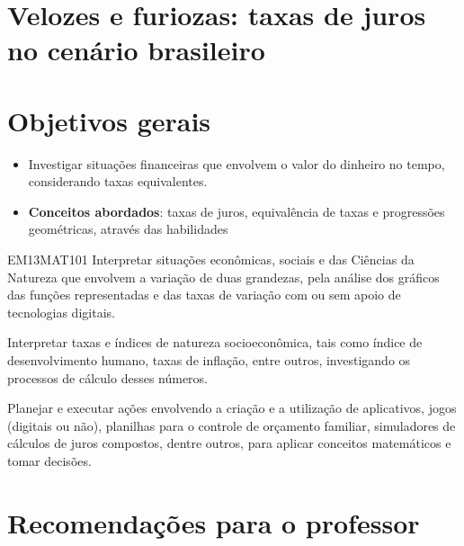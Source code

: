 \begin{paginatexto}\raggedcolumns
\section*{Velozes e furiozas: taxas de juros no cenário brasileiro}
\section*{Objetivos gerais}

\begin{itemize}
\item Investigar situações financeiras que envolvem o valor do dinheiro no tempo, considerando taxas equivalentes.

\item \textbf{Conceitos abordados}: taxas de juros, equivalência de taxas e progressões geométricas, através das habilidades
\end{itemize}

\begin{habilities}{EM13MAT101}
 Interpretar situações econômicas, sociais e das Ciências da Natureza
que envolvem a variação de duas grandezas, pela análise dos gráficos das funções representadas e das taxas de variação com ou sem apoio de tecnologias digitais.


Interpretar taxas e índices de natureza socioeconômica, tais como índice de desenvolvimento humano, taxas de inflação, entre outros, investigando os processos de cálculo desses números.

Planejar e executar ações envolvendo a criação e a utilização de aplicativos, jogos (digitais ou não), planilhas para o controle de orçamento familiar, simuladores de cálculos de juros compostos, dentre outros, para aplicar conceitos matemáticos e tomar decisões. 

\end{habilities}

\section*{Recomendações para o professor}


\end{paginatexto}

